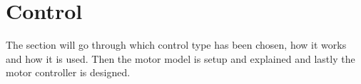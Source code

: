 \section{Control}
\label{sec:control}

The section will go through which control type has been chosen, how it works and how it is used. Then the motor model is setup and explained and lastly the motor controller is designed.









